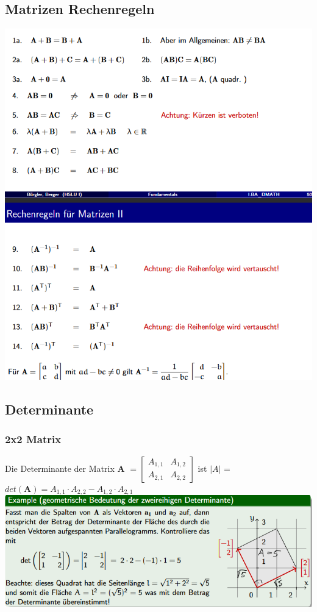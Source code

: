 \documentclass[12pt]{scrartcl}
\begin{document}
\subsection{Matrizen Rechenregeln}
\includegraphics[width=14cm]{img/matrizen_rechenregeln.png}


\newpage
\subsection{Determinante}
\subsubsection{2x2 Matrix}
Die Determinante der Matrix \textbf{A} $= \begin{bmatrix}
    A_{1,1} & A_{1,2}\\
    A_{2,1} & A_{2,2}
\end{bmatrix}$
ist $|A|$ = $det(\textbf{A}) = A_{1,1} \cdot A_{2,2} - A_{1,2} \cdot A_{2,1}$\\

\includegraphics[width=14cm]{img/determinante.png}
\end{document}
